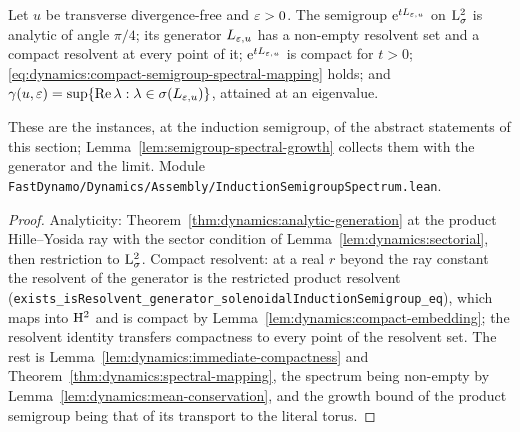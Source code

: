 \begin{theorem}
  \label{thm:dynamics:induction-spectrum}
  \leanok
  Let $u$ be transverse divergence-free and $\varepsilon>0$.  The semigroup $\mathrm{e}^{tL_{\varepsilon,u}}$ on
  $\mathrm{L}^2_\sigma$ is analytic of angle $\pi/4$; its generator $L_{\varepsilon,u}$ has a non-empty
  resolvent set and a compact resolvent at every point of it; $\mathrm{e}^{tL_{\varepsilon,u}}$ is compact
  for $t>0$; \eqref{eq:dynamics:compact-semigroup-spectral-mapping} holds; and
  $\gamma(u,\varepsilon)=\sup\{\operatorname{Re}\lambda:\lambda\in\sigma(L_{\varepsilon,u})\}$, attained at an
  eigenvalue.
\end{theorem}

These are the instances, at the induction semigroup, of the abstract statements of this
section; Lemma~\ref{lem:semigroup-spectral-growth} collects them with the generator and the
limit.  Module \texttt{FastDynamo/Dynamics/Assembly/InductionSemigroupSpectrum.lean}.

\begin{proof}
  \leanok
  Analyticity: Theorem~\ref{thm:dynamics:analytic-generation} at the product Hille--Yosida ray
  with the sector condition of Lemma~\ref{lem:dynamics:sectorial}, then restriction to
  $\mathrm{L}^2_\sigma$.  Compact resolvent: at a real $r$ beyond the ray constant the resolvent of
  the generator is the restricted product resolvent
  (\texttt{exists\_isResolvent\_generator\_solenoidalInductionSemigroup\_eq}), which maps into
  $\mathrm{H}^2$ and is compact by Lemma~\ref{lem:dynamics:compact-embedding}; the resolvent identity
  transfers compactness to every point of the resolvent set.  The rest is
  Lemma~\ref{lem:dynamics:immediate-compactness} and
  Theorem~\ref{thm:dynamics:spectral-mapping}, the spectrum being non-empty by
  Lemma~\ref{lem:dynamics:mean-conservation}, and the growth bound of the product semigroup
  being that of its transport to the literal torus.
\end{proof}

